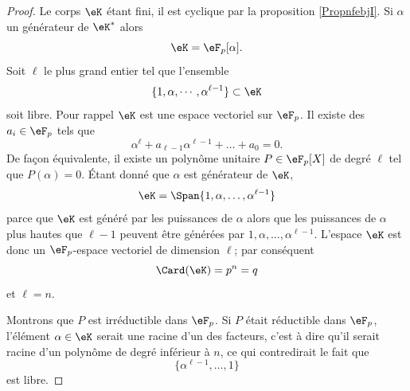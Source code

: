 \begin{proof}
    Le corps \( \eK\) étant fini, il est cyclique par la proposition \ref{PropnfebjI}. Si \( \alpha\) un générateur de \( \eK^*\) alors
    \begin{equation}
        \eK=\eF_p[\alpha].
    \end{equation}
    Soit \( \ell\) le plus grand entier tel que l'ensemble
    \begin{equation}
        \{ 1,\alpha,\cdots,\alpha^{\ell-1} \}\subset\eK
    \end{equation}
    soit libre. Pour rappel \( \eK\) est une espace vectoriel sur \( \eF_p\). Il existe des \( a_i\in \eF_p\) tels que
    \begin{equation}
        \alpha^{\ell}+a_{\ell-1}\alpha^{\ell-1}+\ldots+a_0=0.
    \end{equation}
    De façon équivalente, il existe un polynôme unitaire \( P\in\eF_p[X]\) de degré \( \ell\) tel que \( P(\alpha)=0\). Étant donné que \( \alpha\) est générateur de \( \eK\),
    \begin{equation}
        \eK=\Span\{ 1,\alpha,\ldots, \alpha^{\ell-1} \}
    \end{equation}
    parce que \( \eK\) est généré par les puissances de \( \alpha\) alors que les puissances de \( \alpha\) plus hautes que \( \ell-1\) peuvent être générées par \( 1,\alpha,\ldots, \alpha^{\ell-1}\). L'espace \( \eK\) est donc un \( \eF_p\)-espace vectoriel de dimension \( \ell\); par conséquent
    \begin{equation}
        \Card(\eK)=p^n=q
    \end{equation}
    et \( \ell=n\).

    Montrons que \( P\) est irréductible dans \( \eF_p\). Si \( P\) était réductible dans \( \eF_p\), l'élément \( \alpha\in \eK\) serait une racine d'un des facteurs, c'est à dire qu'il serait racine d'un polynôme de degré inférieur à \( n\), ce qui contredirait le fait que 
    \begin{equation}
        \{ \alpha^{\ell-1},\ldots, 1 \}
    \end{equation}
    est libre.


\end{proof}
